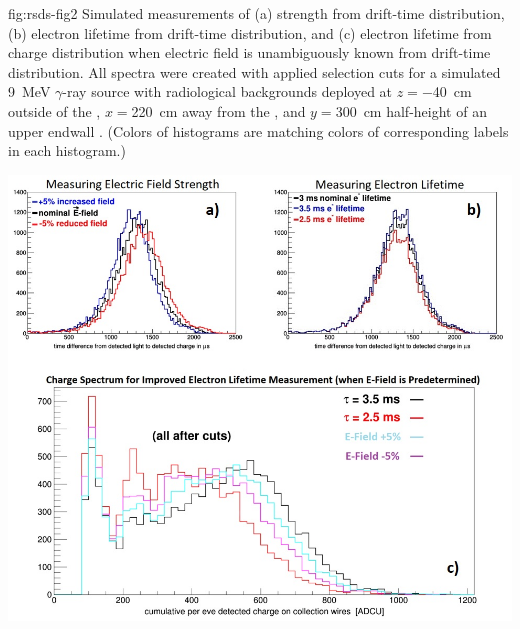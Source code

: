 \begin{dunefigure}
{fig:rsds-fig2}
{Simulated measurements of (a) \efield strength from drift-time distribution, (b) electron lifetime from drift-time distribution, and (c) electron lifetime from charge distribution when electric field is unambiguously known from drift-time distribution. All spectra were created with applied selection cuts for a simulated \SI{9}{\MeV} $\gamma$-ray source with radiological backgrounds deployed at $z=$\SI{-40}{\cm} outside of the , $x=$\SI{220}{\cm} away from the , and $y=$\SI{300}{\cm} half-height of an upper endwall . (Colors of histograms are matching colors of corresponding labels in each histogram.)}
\centering

\includegraphics[width=0.9\linewidth]{graphics/9MeVgamma_withBG_EfieldDriftTimes_eLifetime_chargeSpectrum_cut_nicer2.jpg}    
    
\end{dunefigure}

